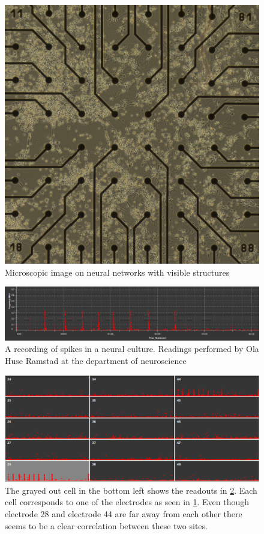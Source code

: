 \begin{figure}[h!]
    \includegraphics[width=\linewidth]{images/cells.png}
    \caption{Microscopic image on neural networks with visible structures}
    \label{fig:cellular_networks}
\end{figure}
\begin{figure}[h!]
    \includegraphics[width=\linewidth]{images/crop_corr28.png}
    \caption{A recording of spikes in a neural culture. Readings performed by
      Ola Huse Ramstad at the department of neuroscience}
    \label{fig:pacemaker}
\end{figure}
\begin{figure}[h!]
    \includegraphics[width=\linewidth]{images/tonic1.png}
    \caption{The grayed out cell in the bottom left shows the readouts in
      \ref{fig:pacemaker}.
      Each cell corresponds to one of the electrodes as seen in
      \ref{fig:cellular_networks}. Even though electrode 28 and electrode 44 are
      far away from each other there seems to be a clear correlation between these two
    sites.}
    \label{fig:correlation}
\end{figure}
